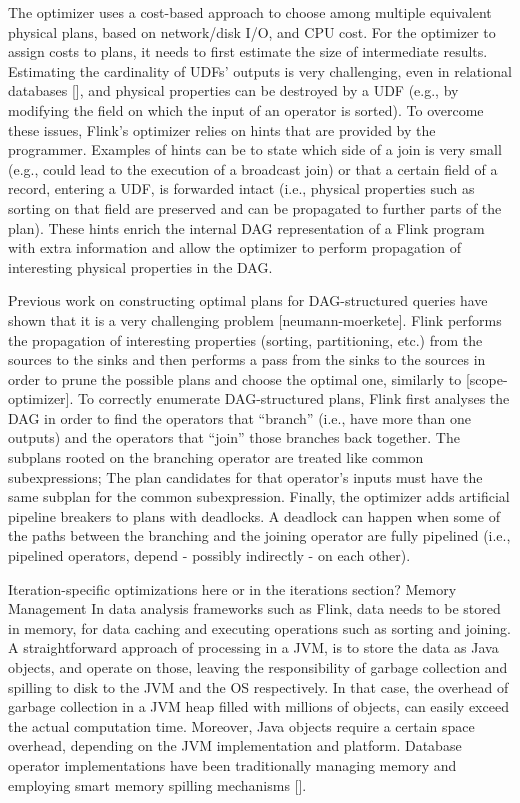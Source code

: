 \documentclass{sig-alternate}
\begin{document}
The optimizer uses a cost-based approach to choose among multiple equivalent physical plans, based on network/disk I/O, and CPU cost. For the optimizer to assign costs to plans, it needs to first estimate the size of intermediate results. Estimating the cardinality of UDFs’ outputs is very challenging, even in relational databases [], and physical properties can be destroyed by a UDF (e.g., by modifying the field on which the input of an operator is sorted). To overcome these issues,  Flink’s optimizer relies on hints that are provided by the programmer. Examples of hints can be to state which side of a join is very small (e.g., could lead to the execution of a broadcast join) or that a certain field of a record, entering a UDF, is forwarded intact (i.e., physical properties such as sorting on that field are preserved and can be propagated to further parts of the plan). These hints enrich the internal DAG representation of a Flink program with extra information and allow the optimizer to perform propagation of interesting physical properties in the DAG. 

Previous work on constructing optimal plans for DAG-structured queries have shown that it is a very challenging problem [neumann-moerkete].  Flink performs the propagation of interesting properties (sorting, partitioning, etc.) from the sources to the sinks and then performs a pass from the sinks to the sources in order to prune the possible plans and choose the optimal one, similarly to [scope-optimizer]. To correctly enumerate DAG-structured plans, Flink first analyses the DAG in order to find the operators that “branch” (i.e., have more than one outputs) and the operators that “join” those branches back together. The subplans rooted on the branching operator are treated like common subexpressions;  The plan candidates for that operator’s inputs must have the same subplan for the common subexpression. Finally, the optimizer adds artificial pipeline breakers to plans with deadlocks. A deadlock can happen when some of the paths between the branching and the joining operator are fully pipelined (i.e., pipelined operators, depend - possibly indirectly -  on each other).

Iteration-specific optimizations here or in the iterations section?
Memory Management
In data analysis frameworks such as Flink, data needs to be stored in memory, for data caching and executing operations such as sorting and joining. A straightforward approach of processing in a JVM, is to store the data as Java objects, and operate on those, leaving the responsibility of garbage collection and spilling to disk to the JVM and the OS respectively. In that case, the overhead of garbage collection in a JVM heap filled with millions of objects, can easily exceed the actual computation time. Moreover, Java objects require a certain space overhead, depending on the JVM implementation and platform. Database operator implementations have been traditionally managing memory and employing smart memory spilling mechanisms [].
\end{document}
